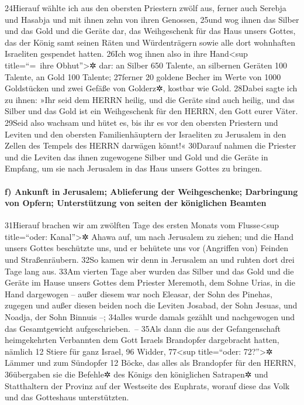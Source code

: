 24Hierauf wählte ich aus den obersten Priestern zwölf aus, ferner auch
Serebja und Hasabja und mit ihnen zehn von ihren Genossen, 25und wog
ihnen das Silber und das Gold und die Geräte dar, das Weihgeschenk für
das Haus unsers Gottes, das der König samt seinen Räten und
Würdenträgern sowie alle dort wohnhaften Israeliten gespendet hatten.
26Ich wog ihnen also in ihre Hand\textless sup title=``=~ihre
Obhut''\textgreater✲ dar: an Silber 650 Talente, an silbernen Geräten
100 Talente, an Gold 100 Talente; 27ferner 20 goldene Becher im Werte
von 1000 Goldstücken und zwei Gefäße von Golderz✲, kostbar wie Gold.
28Dabei sagte ich zu ihnen: »Ihr seid dem HERRN heilig, und die Geräte
sind auch heilig, und das Silber und das Gold ist ein Weihgeschenk für
den HERRN, den Gott eurer Väter. 29Seid also wachsam und hütet es, bis
ihr es vor den obersten Priestern und Leviten und den obersten
Familienhäuptern der Israeliten zu Jerusalem in den Zellen des Tempels
des HERRN darwägen könnt!« 30Darauf nahmen die Priester und die Leviten
das ihnen zugewogene Silber und Gold und die Geräte in Empfang, um sie
nach Jerusalem in das Haus unsers Gottes zu bringen.

\hypertarget{f-ankunft-in-jerusalem-ablieferung-der-weihgeschenke-darbringung-von-opfern-unterstuxfctzung-von-seiten-der-kuxf6niglichen-beamten}{%
\paragraph{f) Ankunft in Jerusalem; Ablieferung der Weihgeschenke;
Darbringung von Opfern; Unterstützung von seiten der königlichen
Beamten}\label{f-ankunft-in-jerusalem-ablieferung-der-weihgeschenke-darbringung-von-opfern-unterstuxfctzung-von-seiten-der-kuxf6niglichen-beamten}}

31Hierauf brachen wir am zwölften Tage des ersten Monats vom
Flusse\textless sup title=``oder: Kanal''\textgreater✲ Ahawa auf, um
nach Jerusalem zu ziehen; und die Hand unsers Gottes beschützte uns, und
er behütete uns vor (Angriffen von) Feinden und Straßenräubern. 32So
kamen wir denn in Jerusalem an und ruhten dort drei Tage lang aus. 33Am
vierten Tage aber wurden das Silber und das Gold und die Geräte im Hause
unsers Gottes dem Priester Meremoth, dem Sohne Urias, in die Hand
dargewogen -- außer diesem war noch Eleasar, der Sohn des Pinehas,
zugegen und außer diesen beiden noch die Leviten Josabad, der Sohn
Jesuas, und Noadja, der Sohn Binnuis --; 34alles wurde damals gezählt
und nachgewogen und das Gesamtgewicht aufgeschrieben.~-- 35Als dann die
aus der Gefangenschaft heimgekehrten Verbannten dem Gott Israels
Brandopfer dargebracht hatten, nämlich 12 Stiere für ganz Israel, 96
Widder, 77\textless sup title=``oder: 72?''\textgreater✲ Lämmer und zum
Sündopfer 12 Böcke, das alles als Brandopfer für den HERRN, 36übergaben
sie die Befehle✲ des Königs den königlichen Satrapen✲ und Statthaltern
der Provinz auf der Westseite des Euphrats, worauf diese das Volk und
das Gotteshaus unterstützten.

